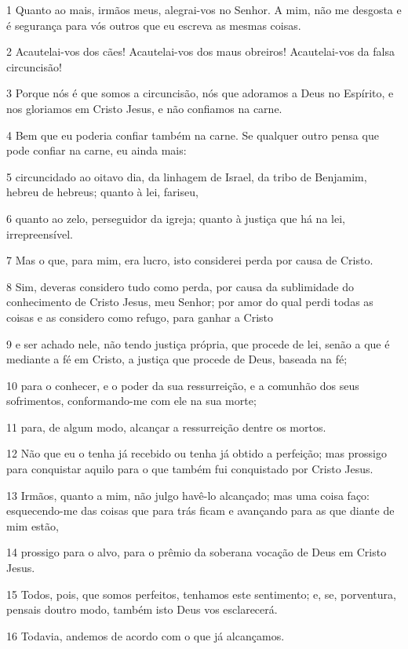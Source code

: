 \par 1 Quanto ao mais, irmãos meus, alegrai-vos no Senhor. A mim, não me desgosta e é segurança para vós outros que eu escreva as mesmas coisas.
\par 2 Acautelai-vos dos cães! Acautelai-vos dos maus obreiros! Acautelai-vos da falsa circuncisão!
\par 3 Porque nós é que somos a circuncisão, nós que adoramos a Deus no Espírito, e nos gloriamos em Cristo Jesus, e não confiamos na carne.
\par 4 Bem que eu poderia confiar também na carne. Se qualquer outro pensa que pode confiar na carne, eu ainda mais:
\par 5 circuncidado ao oitavo dia, da linhagem de Israel, da tribo de Benjamim, hebreu de hebreus; quanto à lei, fariseu,
\par 6 quanto ao zelo, perseguidor da igreja; quanto à justiça que há na lei, irrepreensível.
\par 7 Mas o que, para mim, era lucro, isto considerei perda por causa de Cristo.
\par 8 Sim, deveras considero tudo como perda, por causa da sublimidade do conhecimento de Cristo Jesus, meu Senhor; por amor do qual perdi todas as coisas e as considero como refugo, para ganhar a Cristo
\par 9 e ser achado nele, não tendo justiça própria, que procede de lei, senão a que é mediante a fé em Cristo, a justiça que procede de Deus, baseada na fé;
\par 10 para o conhecer, e o poder da sua ressurreição, e a comunhão dos seus sofrimentos, conformando-me com ele na sua morte;
\par 11 para, de algum modo, alcançar a ressurreição dentre os mortos.
\par 12 Não que eu o tenha já recebido ou tenha já obtido a perfeição; mas prossigo para conquistar aquilo para o que também fui conquistado por Cristo Jesus.
\par 13 Irmãos, quanto a mim, não julgo havê-lo alcançado; mas uma coisa faço: esquecendo-me das coisas que para trás ficam e avançando para as que diante de mim estão,
\par 14 prossigo para o alvo, para o prêmio da soberana vocação de Deus em Cristo Jesus.
\par 15 Todos, pois, que somos perfeitos, tenhamos este sentimento; e, se, porventura, pensais doutro modo, também isto Deus vos esclarecerá.
\par 16 Todavia, andemos de acordo com o que já alcançamos.
